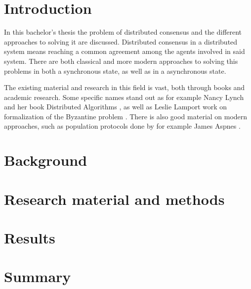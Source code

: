 \documentclass[english, 12pt, a4paper, sci, utf8, a-1b, online]{aaltothesis}
\begin{document}
\section{Introduction}
\thispagestyle{empty}

In this bachelor's thesis the problem of distributed consensus and the different approaches to solving it are discussed. Distributed consensus in a distributed system means reaching a common agreement among the agents involved in said system. There are both classical and more modern approaches to solving this problems in both a synchronous state, as well as in a asynchronous state. 

The existing material and research in this field is vast, both through books and academic research. Some specific names stand out as for example Nancy Lynch and her book Distributed Algorithms \cite{distributed_algorithms}, as well as Leslie Lamport work on formalization of the Byzantine problem \cite{byzantine_generals}. There is also good material on modern approaches, such as population protocols done by for example James Aspnes \cite{simple_populaiton_protocol}.
\clearpage


\clearpage


\section{Background}

\clearpage


\section{Research material and methods}

\clearpage


\section{Results}

\clearpage

\section{Summary} 

\clearpage






\clearpage

\thesisappendix
\end{document}
